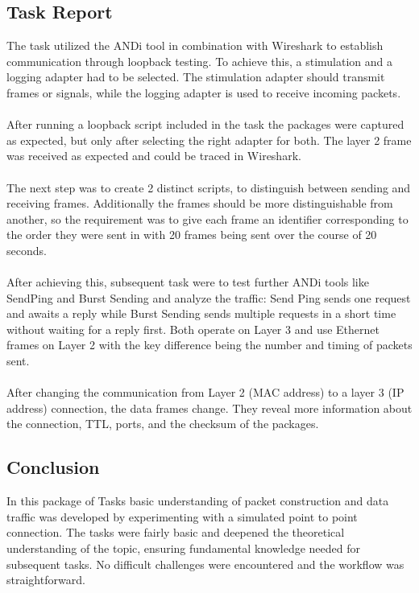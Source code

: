 \subsection{Task Report}
The task utilized the ANDi tool in combination with Wireshark to establish communication through loopback testing. To achieve this, a stimulation and a logging adapter had to be selected. The stimulation adapter should transmit frames or signals, while the logging adapter is used to receive incoming packets.\\\\
After running a loopback script included in the task the packages were captured as expected, but only after selecting the right adapter for both. The layer 2 frame was received as expected and could be traced in Wireshark.\\\\
The next step was to create 2 distinct scripts, to distinguish between sending and receiving frames. Additionally the frames should be more distinguishable from another, so the requirement was to give each frame an identifier corresponding to the order they were sent in with 20 frames being sent over the course of 20 seconds.\\\\
After achieving this, subsequent task were to test further ANDi tools like SendPing and Burst Sending and analyze the traffic: Send Ping sends one request and awaits a reply while Burst Sending sends multiple requests in a short time without waiting for a reply first. Both operate on Layer 3 and use Ethernet frames on Layer 2 with the key difference being the number and timing of packets sent. \\\\
After changing the communication from Layer 2 (MAC address) to a layer 3 (IP address)  connection, the data frames change. They reveal more information about the connection, TTL, ports, and the checksum of the packages. 

\subsection{Conclusion}
In this package of Tasks basic understanding of packet construction and data traffic was developed by experimenting with a simulated point to point connection. The tasks were fairly basic and deepened the theoretical understanding of the topic, ensuring fundamental knowledge needed for subsequent tasks. No difficult challenges were encountered and the workflow was straightforward.


